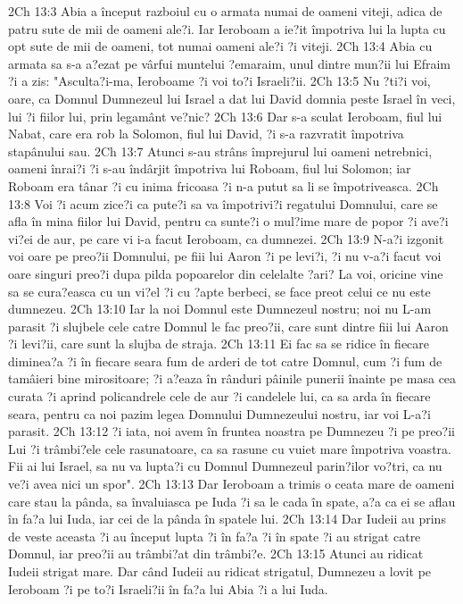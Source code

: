 2Ch 13:3  Abia a început razboiul cu o armata numai de oameni viteji, adica de patru sute de mii de oameni ale?i. Iar Ieroboam a ie?it împotriva lui la lupta cu opt sute de mii de oameni, tot numai oameni ale?i ?i viteji.
2Ch 13:4  Abia cu armata sa s-a a?ezat pe vârfui muntelui ?emaraim, unul dintre mun?ii lui Efraim ?i a zis: "Asculta?i-ma, Ieroboame ?i voi to?i Israeli?ii.
2Ch 13:5  Nu ?ti?i voi, oare, ca Domnul Dumnezeul lui Israel a dat lui David domnia peste Israel în veci, lui ?i fiilor lui, prin legamânt ve?nic?
2Ch 13:6  Dar s-a sculat Ieroboam, fiul lui Nabat, care era rob la Solomon, fiul lui David, ?i s-a razvratit împotriva stapânului sau.
2Ch 13:7  Atunci s-au strâns împrejurul lui oameni netrebnici, oameni înrai?i ?i s-au îndârjit împotriva lui Roboam, fiul lui Solomon; iar Roboam era tânar ?i cu inima fricoasa ?i n-a putut sa li se împotriveasca.
2Ch 13:8  Voi ?i acum zice?i ca pute?i sa va împotrivi?i regatului Domnului, care se afla în mina fiilor lui David, pentru ca sunte?i o mul?ime mare de popor ?i ave?i vi?ei de aur, pe care vi i-a facut Ieroboam, ca dumnezei.
2Ch 13:9  N-a?i izgonit voi oare pe preo?ii Domnului, pe fiii lui Aaron ?i pe levi?i, ?i nu v-a?i facut voi oare singuri preo?i dupa pilda popoarelor din celelalte ?ari? La voi, oricine vine sa se cura?easca cu un vi?el ?i cu ?apte berbeci, se face preot celui ce nu este dumnezeu.
2Ch 13:10  Iar la noi Domnul este Dumnezeul nostru; noi nu L-am parasit ?i slujbele cele catre Domnul le fac preo?ii, care sunt dintre fiii lui Aaron ?i levi?ii, care sunt la slujba de straja.
2Ch 13:11  Ei fac sa se ridice în fiecare diminea?a ?i în fiecare seara fum de arderi de tot catre Domnul, cum ?i fum de tamâieri bine mirositoare; ?i a?eaza în rânduri pâinile punerii înainte pe masa cea curata ?i aprind policandrele cele de aur ?i candelele lui, ca sa arda în fiecare seara, pentru ca noi pazim legea Domnului Dumnezeului nostru, iar voi L-a?i parasit.
2Ch 13:12  ?i iata, noi avem în fruntea noastra pe Dumnezeu ?i pe preo?ii Lui ?i trâmbi?ele cele rasunatoare, ca sa rasune cu vuiet mare împotriva voastra. Fii ai lui Israel, sa nu va lupta?i cu Domnul Dumnezeul parin?ilor vo?tri, ca nu ve?i avea nici un spor".
2Ch 13:13  Dar Ieroboam a trimis o ceata mare de oameni care stau la pânda, sa învaluiasca pe Iuda ?i sa le cada în spate, a?a ca ei se aflau în fa?a lui Iuda, iar cei de la pânda în spatele lui.
2Ch 13:14  Dar Iudeii au prins de veste aceasta ?i au început lupta ?i în fa?a ?i în spate ?i au strigat catre Domnul, iar preo?ii au trâmbi?at din trâmbi?e.
2Ch 13:15  Atunci au ridicat Iudeii strigat mare. Dar când Iudeii au ridicat strigatul, Dumnezeu a lovit pe Ieroboam ?i pe to?i Israeli?ii în fa?a lui Abia ?i a lui Iuda.
